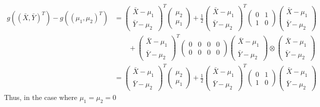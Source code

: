 \documentclass[
  letterpaper,
  DIV=11,
  numbers=noendperiod]{scrreprt}
\begin{document}
\[\begin{aligned}
g((\bar X,  \bar Y)^T) - g((\mu_1,\mu_2)^T) &= \begin{pmatrix} \bar X - \mu_1  \\ \bar Y- \mu_2\end{pmatrix}^T \begin{pmatrix} \mu_2 \\ \mu_1 \end{pmatrix} + \frac 1 2 \begin{pmatrix} \bar X - \mu_1  \\ \bar Y- \mu_2\end{pmatrix}^T \begin{pmatrix} 0 & 1 \\ 1 & 0 \end{pmatrix} \begin{pmatrix} \bar X - \mu_1  \\ \bar Y- \mu_2\end{pmatrix} \\
&~~~~~~~~~+ \begin{pmatrix} \bar X - \mu_1  \\ \bar Y- \mu_2\end{pmatrix}^T \begin{pmatrix} 0 & 0 & 0 & 0\\ 0 & 0& 0 &0 \end{pmatrix} \begin{pmatrix} \bar X - \mu_1  \\ \bar Y- \mu_2\end{pmatrix} \otimes\begin{pmatrix} \bar X - \mu_1  \\ \bar Y- \mu_2\end{pmatrix} \\
&= \begin{pmatrix} \bar X - \mu_1  \\ \bar Y- \mu_2\end{pmatrix}^T \begin{pmatrix} \mu_2 \\ \mu_1 \end{pmatrix} + \frac 1 2 \begin{pmatrix} \bar X - \mu_1  \\ \bar Y- \mu_2\end{pmatrix}^T \begin{pmatrix} 0 & 1 \\ 1 & 0 \end{pmatrix} \begin{pmatrix} \bar X - \mu_1  \\ \bar Y- \mu_2\end{pmatrix} 
\end{aligned}\] Thus, in the case where \(\mu_1=\mu_2= 0\)
\end{document}
